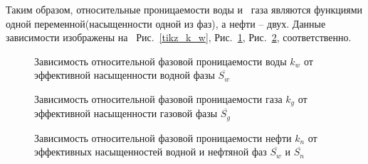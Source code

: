 Таким образом, относительные проницаемости воды и~ газа являются функциями одной 
переменной(насыщенности одной из фаз), а нефти -- двух. Данные зависимости
изображены на~ Рис.~\ref{tikz_k_w}, Рис.~\ref{tikz_k_g}, Рис.~\ref{tikz_k_n},
соответственно.

\begin{figure}[h]
\begin{minipage}[h]{0.49\linewidth}
\caption{Зависимость относительной фазовой проницаемости воды $k_w$
  от эффективной насыщенности водной фазы $\overline{S_w}$}
\label{tikz_k_w}
\end{minipage}
\hfill
\begin{minipage}[h]{0.49\linewidth}
\caption{Зависимость относительной фазовой проницаемости газа $k_g$ 
  от эффективной насыщенности газовой фазы $\overline{S_g}$}
\label{tikz_k_g}
\end{minipage}
\end{figure}

\begin{figure}[h]
\begin{center}
\caption{Зависимость относительной фазовой проницаемости нефти $k_n$ 
  от эффективных насыщенностей водной и нефтяной фаз $\overline{S_w}$ и $\overline{S_n}$}
\label{tikz_k_n}
\end{center}
\end{figure}

